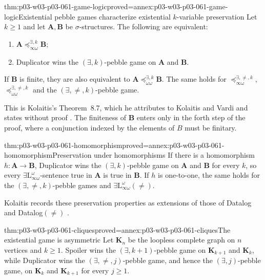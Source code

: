 \begin{hbtheorem}{thm:p03-w03-p03-061-game-logic}{proved=annex:p03-w03-p03-061-game-logic}{Existential pebble games characterize existential \(k\)-variable preservation}
Let \(k\ge1\) and let \(\mathbf A,\mathbf B\) be \(\sigma\)-structures. The
following are equivalent:
\begin{enumerate}
\item \(\mathbf A\preceq^{\exists,k}_{\infty\omega}\mathbf B\);
\item Duplicator wins the \((\exists,k)\)-pebble game on \(\mathbf A\) and
      \(\mathbf B\).
\end{enumerate}
If \(\mathbf B\) is finite, they are also equivalent to
\(\mathbf A\preceq^{\exists,k}_{\omega\omega}\mathbf B\). The same holds for
\(\preceq^{\exists,\neq,k}_{\infty\omega}\),
\(\preceq^{\exists,\neq,k}_{\omega\omega}\) and the
\((\exists,\neq,k)\)-pebble game.
\end{hbtheorem}

This is Kolaitis's Theorem~8.7, which he attributes to Kolaitis and Vardi and
states without proof \cite[Thm~8.7, p.~73]{Kolaitis2003ExpressivePowerNotes}.
The finiteness of \(\mathbf B\) enters only in the forth step of the proof,
where a conjunction indexed by the elements of \(B\) must be finitary.

\begin{hbtheorem}{thm:p03-w03-p03-061-homomorphism}{proved=annex:p03-w03-p03-061-homomorphism}{Preservation under homomorphisms}
If there is a homomorphism \(h\colon\mathbf A\to\mathbf B\), Duplicator wins
the \((\exists,k)\)-pebble game on \(\mathbf A\) and \(\mathbf B\) for every
\(k\), so every \(\exists\mathrm L^\omega_{\infty\omega}\)-sentence true in
\(\mathbf A\) is true in \(\mathbf B\). If \(h\) is one-to-one, the same holds
for the \((\exists,\neq,k)\)-pebble games and
\(\exists\mathrm L^\omega_{\infty\omega}(\neq)\).
\end{hbtheorem}

Kolaitis records these preservation properties as extensions of those of
Datalog and Datalog\((\neq)\) \cite[p.~71]{Kolaitis2003ExpressivePowerNotes}.

\begin{hbtheorem}{thm:p03-w03-p03-061-cliques}{proved=annex:p03-w03-p03-061-cliques}{The existential game is asymmetric}
Let \(\mathbf K_n\) be the loopless complete graph on \(n\) vertices and
\(k\ge1\). Spoiler wins the \((\exists,k+1)\)-pebble game on
\(\mathbf K_{k+1}\) and \(\mathbf K_k\), while Duplicator wins the
\((\exists,\neq,j)\)-pebble game, and hence the \((\exists,j)\)-pebble game,
on \(\mathbf K_k\) and \(\mathbf K_{k+1}\) for every \(j\ge1\).
\end{hbtheorem}

